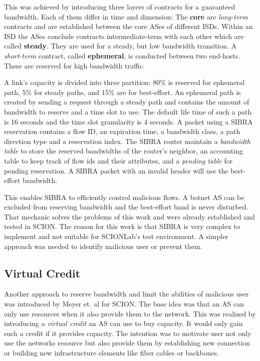 \documentclass[thesis.tex]{subfiles}
\begin{document}
This was achieved by introducing three layers of contracts for a guaranteed bandwidth. Each of them differ in time and dimension: The \textbf{core} are \textit{long-term} contracts and are established between the core ASes of different ISDs. Within an ISD the ASes conclude contracts intermediate-term with each other which are called \textbf{steady}. They are used for a steady, but low bandwidth transition. A \textit{short-term} contract, called \textbf{ephemeral}, is conducted between two end-hosts. These are reserved for high bandwidth traffic. 

A link's capacity is divided into three partition: 80\% is reserved for ephemeral path, 5\% for steady paths, and 15\% are for best-effort. An ephemeral path is created by sending a request through a steady path and contains the amount of bandwidth to reserve and a time slot to use. The default life time of such a path is 16 seconds and the time slot granularity is 4 seconds. A packet using a SIBRA reservation contains a flow ID, an expiration time, a bandwidth class, a path direction type and a reservation index. The SIBRA router maintain a \textit{bandwidth table} to store the reserved bandwidths of the router's neighbor, an accounting table to keep track of flow ids and their attributes, and a \textit{pending table} for pending reservation. A SIBRA packet with an invalid header will use the best-effort bandwidth.

This enables SIBRA to efficiently control malicious flows. A botnet AS can be excluded from reserving bandwidth and the best-effort band is never disturbed. That mechanic solves the problems of this work and were already established and tested in SCION. The reason for this work is that SIBRA is very complex to implement and not suitable for SCIONLab's test environment. A simpler approach was needed to identify malicious user or prevent them.

\subsection{Virtual Credit} \cite{DennisMeyer.2017}
Another approach to reserve bandwidth and limit the abilities of malicious user was introduced by Meyer et. al for SCION. The base idea was that an AS can only use resources when it also provide them to the network. This was realized by introducing a \textit{virtual credit} an AS can use to buy capacity. It would only gain such a credit if it provides capacity. The intention was to motivate user not only use the networks resource but also provide them by establishing new connection or building new infrastructure elements like fiber cables or backbones.
\end{document}
